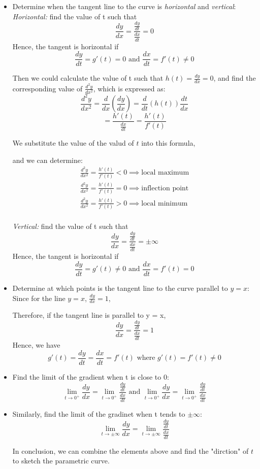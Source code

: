 \documentclass[12pt]{report}
\begin{document}
\begin{itemize}
    \item Determine when the tangent line to the curve is \emph{horizontal} and \emph{vertical}:
    \emph{Horizontal:} find the value of t such that
    $$
    \frac{dy}{dx} = \frac{\frac{dy}{dt}}{\frac{dx}{dt}} = 0
    $$
     \indent Hence, the tangent is horizontal if
     $$
    \frac{dy}{dt} =  g'(t) = 0 \text{ and }\frac{dx}{dt} = f'(t) \neq 0
     $$

    Then we could calculate the value of t such that $h(t) = \frac{dy}{dx} = 0$, and find the corresponding value of $\frac{d^2y}{dx^2}$, which is expressed as:
    $$
    \frac{d^2y}{dx^2} = \frac{d}{dx}(\frac{dy}{dx}) = \frac{d}{dt}(h(t))\frac{dt}{dx}
    $$
    $$
    = \frac{h'(t)}{\frac{dx}{dt}} = \frac{h'(t)}{f'(t)} 
    $$

    We substitute the value of the valud of $t$ into this formula, 
    
    and we can determine:
    $$
    \begin{array}{l}
         \frac{d^2y}{dx^2} = \frac{h'(t)}{f'(t)} < 0 \implies \text{local maximum} \\
         \frac{d^2y}{dx^2} = \frac{h'(t)}{f'(t)} = 0 \implies \text{inflection point} \\
         \frac{d^2y}{dx^2} = \frac{h'(t)}{f'(t)} > 0 \implies \text{local minimum} \\
    \end{array}
    $$

     \emph{Vertical:} find the value of t such that
     $$
     \frac{dy}{dx} = \frac{\frac{dy}{dt}}{\frac{dx}{dt}} = \pm \infty
     $$
     \indent Hence, the tangent is horizontal if
     $$
    \frac{dy}{dt} =  g'(t) \neq 0\text{ and } \frac{dx}{dt} = f'(t) = 0
     $$
    \item Determine at which points is the tangent line to the curve parallel to $y = x$:
    \newline Since for the line $y = x$, $\frac{dy}{dx} = 1$,

    Therefore, if the tangent line is parallel to y = x, 
    $$
    \frac{dy}{dx} = \frac{\frac{dy}{dt}}{\frac{dx}{dt}} = 1
    $$
    \newline Hence, we have 
    $$
    g'(t) = \frac{dy}{dt} = \frac{dx}{dt} = f'(t)
    \text{ where } g'(t) = f'(t) \neq 0$$
    \item Find the limit of the gradient when t is close to 0:
    \newline  $$
    \lim_{t \to 0^+} \frac{dy}{dx} = \lim_{t \to 0^+} \frac{\frac{dy}{dt}}{\frac{dx}{dt}}
    \text{ and }
    \lim_{t \to 0^+} \frac{dy}{dx} = \lim_{t \to 0^+} \frac{\frac{dy}{dt}}{\frac{dx}{dt}}
    $$
    \item Similarly, find the limit of the gradinet when t tends to $\pm \infty$:
    \newline $$
    \lim_{t \to \pm \infty} \frac{dy}{dx} = \lim_{t \to \pm \infty} \frac{\frac{dy}{dt}}{\frac{dx}{dt}}
    $$
    
    In conclusion, we can combine the elements above and find the "dirction" of $t$ to sketch the parametric curve. 
\end{itemize}
 
\end{document}
